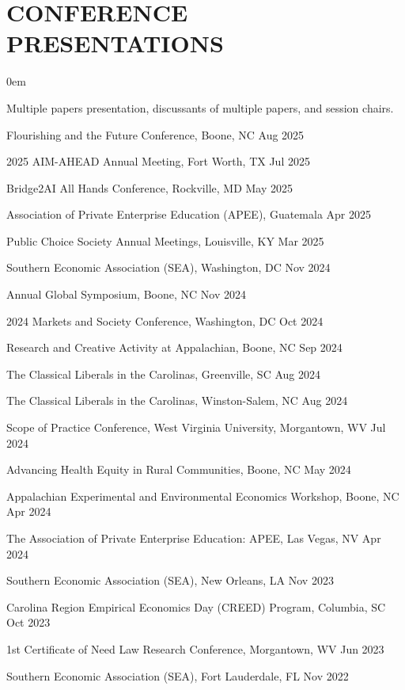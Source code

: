 \section*{CONFERENCE PRESENTATIONS}
\begin{etaremune}
\itemsep0em
\item[] Multiple papers presentation, discussants of multiple papers, and session chairs.
\item Flourishing and the Future Conference, Boone, NC \hfill Aug 2025
\item 2025 AIM-AHEAD Annual Meeting, Fort Worth, TX \hfill Jul 2025
\item Bridge2AI All Hands Conference, Rockville, MD \hfill May 2025
\item Association of Private Enterprise Education (APEE), Guatemala \hfill Apr 2025
\item Public Choice Society Annual Meetings, Louisville, KY  \hfill Mar 2025
\item Southern Economic Association (SEA), Washington, DC \hfill Nov 2024
\item Annual Global Symposium, Boone, NC \hfill Nov 2024
\item 2024 Markets and Society Conference, Washington, DC \hfill Oct 2024
\item Research and Creative Activity at Appalachian, Boone, NC \hfill Sep 2024
\item The Classical Liberals in the Carolinas, Greenville, SC \hfill Aug 2024
\item The Classical Liberals in the Carolinas, Winston-Salem, NC \hfill Aug 2024
\item Scope of Practice Conference, West Virginia University, Morgantown, WV \hfill Jul 2024
\item Advancing Health Equity in Rural Communities, Boone, NC \hfill May 2024
\item Appalachian Experimental and Environmental Economics Workshop, Boone, NC \hfill Apr 2024
\item The Association of Private Enterprise Education: APEE, Las Vegas, NV \hfill Apr 2024
\item Southern Economic Association (SEA), New Orleans, LA \hfill Nov 2023
\item Carolina Region Empirical Economics Day (CREED) Program, Columbia, SC \hfill Oct 2023
\item 1st Certificate of Need Law Research Conference, Morgantown, WV \hfill Jun 2023
\item Southern Economic Association (SEA), Fort Lauderdale, FL \hfill Nov 2022

\end{etaremune}
